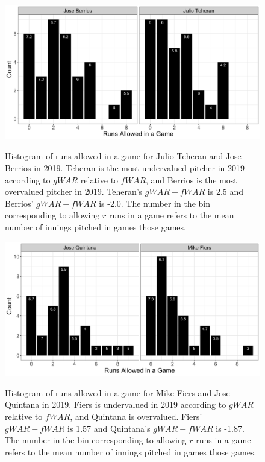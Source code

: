 \documentclass[12pt]{article}
\begin{document}
\begin{figure}[t!]
\centering
\caption{Histogram of runs allowed in a game for Julio Teheran and Jose Berrios in 2019. Teheran is the most undervalued pitcher in 2019 according to $gWAR$ relative to $fWAR$, and Berrios is the most overvalued pitcher in 2019. Teheran's $gWAR - fWAR$ is 2.5 and Berrios' $gWAR - fWAR$ is -2.0. The number in the bin corresponding to allowing $r$ runs in a game refers to the mean number of innings pitched in games those games.} 
\includegraphics[width=15cm]{../writeup_plots/p7_2019.png}
\label{fig:p7}
\end{figure}

\begin{figure}[t!]
\centering
\caption{Histogram of runs allowed in a game for Mike Fiers and Jose Quintana in 2019. Fiers is undervalued in 2019 according to $gWAR$ relative to $fWAR$, and Quintana is overvalued. Fiers' $gWAR - fWAR$ is 1.57 and Quintana's $gWAR - fWAR$ is -1.87. The number in the bin corresponding to allowing $r$ runs in a game refers to the mean number of innings pitched in games those games.} 
\includegraphics[width=15cm]{../writeup_plots/p8_2019.png}
\label{fig:p8}
\end{figure}
\end{document}
